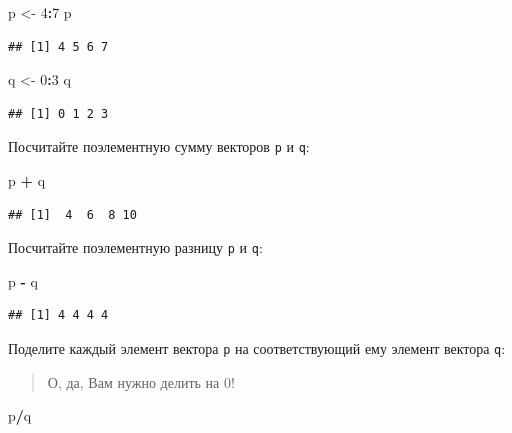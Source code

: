\documentclass[]{book}
\newenvironment{Shaded}{\begin{snugshade}}{\end{snugshade}}
\newcommand{\DecValTok}[1]{\textcolor[rgb]{0.00,0.00,0.81}{#1}}
\newcommand{\NormalTok}[1]{#1}
\newcommand{\OperatorTok}[1]{\textcolor[rgb]{0.81,0.36,0.00}{\textbf{#1}}}
\newcommand{\StringTok}[1]{\textcolor[rgb]{0.31,0.60,0.02}{#1}}
\begin{document}
\begin{Shaded}
\begin{Highlighting}[]
\NormalTok{p <-}\StringTok{ }\DecValTok{4}\OperatorTok{:}\DecValTok{7}
\NormalTok{p}
\end{Highlighting}
\end{Shaded}

\begin{verbatim}
## [1] 4 5 6 7
\end{verbatim}

\begin{Shaded}
\begin{Highlighting}[]
\NormalTok{q <-}\StringTok{ }\DecValTok{0}\OperatorTok{:}\DecValTok{3}
\NormalTok{q}
\end{Highlighting}
\end{Shaded}

\begin{verbatim}
## [1] 0 1 2 3
\end{verbatim}

Посчитайте поэлементную сумму векторов \texttt{p} и \texttt{q}:

\begin{Shaded}
\begin{Highlighting}[]
\NormalTok{p }\OperatorTok{+}\StringTok{ }\NormalTok{q}
\end{Highlighting}
\end{Shaded}

\begin{verbatim}
## [1]  4  6  8 10
\end{verbatim}

Посчитайте поэлементную разницу \texttt{p} и \texttt{q}:

\begin{Shaded}
\begin{Highlighting}[]
\NormalTok{p }\OperatorTok{-}\StringTok{ }\NormalTok{q}
\end{Highlighting}
\end{Shaded}

\begin{verbatim}
## [1] 4 4 4 4
\end{verbatim}

Поделите каждый элемент вектора \texttt{p} на соответствующий ему элемент вектора \texttt{q}:

\begin{quote}
О, да, Вам нужно делить на 0!
\end{quote}

\begin{Shaded}
\begin{Highlighting}[]
\NormalTok{p}\OperatorTok{/}\NormalTok{q}
\end{Highlighting}
\end{Shaded}
\end{document}
